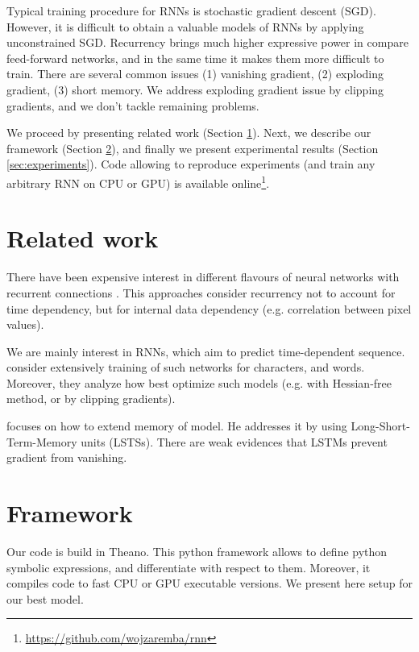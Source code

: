 \documentclass{article}
\begin{document}
Typical training procedure for RNNs is stochastic gradient descent (SGD). However, it is difficult to obtain
a valuable models of RNNs by applying unconstrained SGD.
Recurrency brings much higher expressive power in compare feed-forward networks, and in the same time it makes them more difficult to train. There
are several common issues (1) vanishing gradient, (2) exploding gradient, (3) short memory. We address
exploding gradient issue by clipping gradients, and we don't tackle remaining problems.


We proceed by presenting related work (Section \ref{sec:related work}). Next, we describe our framework (Section
\ref{sec:framework}), and finally we present experimental results (Section \ref{sec:experiments}). 
Code allowing to reproduce experiments (and train any arbitrary RNN on CPU or GPU) is available online\footnote{\url{https://github.com/wojzaremba/rnn}}.

\section{Related work}\label{sec:related work}
There have been expensive interest in different flavours of neural networks 
with recurrent connections \cite{hopfield1982neural, hinton2006fast}. This
approaches consider recurrency not to account for time dependency, but
for internal data dependency (e.g. correlation between pixel values). 


We are mainly interest in RNNs, which aim to predict 
time-dependent sequence. \cite{mikolov2012statistical} 
\cite{sutskever2013training} consider extensively 
training of such networks for characters, and words. Moreover,
they analyze how best optimize such models (e.g. with Hessian-free method, or 
by clipping gradients).


\cite{graves2013generating} focuses on how to extend memory of model. 
He addresses it by using Long-Short-Term-Memory units (LSTSs).
There are weak evidences that LSTMs prevent gradient from vanishing.

\section{Framework}\label{sec:framework}
Our code is build in Theano. This python framework allows to define python symbolic expressions, and 
differentiate with respect to them. Moreover, it compiles code to fast CPU or GPU executable versions.
We present here setup for our best model.
\end{document}
